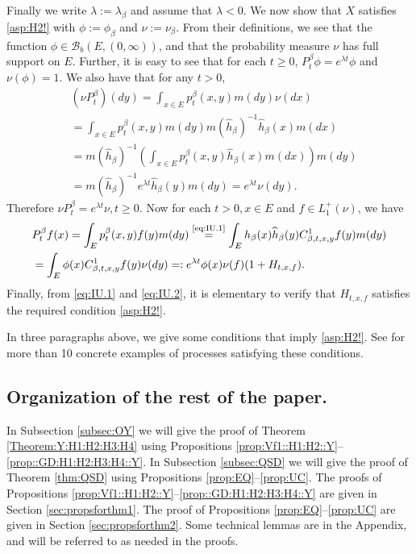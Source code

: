 \documentclass[12pt,a4paper]{amsart}
\numberwithin{equation}{section}
\theoremstyle{plain}
\theoremstyle{definition}
\theoremstyle{remark}
\begin{document}
Finally we write $\lambda := \lambda_\beta$ and assume that $ \lambda< 0$. We now show that $X$ satisfies \eqref{asp:H2!} with $\phi:=\phi_\beta$ and $\nu:= \nu_\beta$.
	From their definitions, we see that the function $\phi \in \mathcal B_b(E,(0,\infty))$, and that the probability measure $\nu$ has full support on $E$.
	Further, it is easy to see that for each $t\geq 0$, $P_t^\beta \phi = e^{\lambda t}\phi$ and $\nu(\phi) = 1$.
	We also have that for any $t>0$,
\begin{align}
	&(\nu P_t^\beta)(dy) = \int_{x\in E}p_{t}^\beta(x,y)m(dy) \nu(dx)
	\\&= \int_{x\in E}p_{t}^\beta(x,y)m(dy) m(\widehat h_\beta)^{-1}\widehat h_\beta(x)m(dx)
	\\&=  m(\widehat h_\beta)^{-1}  \left(\int_{x\in E} p_t^\beta(x,y) \widehat h_\beta(x) m(dx) \right) m(dy)
	\\& = m(\widehat h_\beta)^{-1} e^{\lambda t}\widehat h_\beta(y) m(dy) =
	e^{\lambda t}\nu(dy).
\end{align}
	Therefore $\nu P_t^\beta = e^{\lambda t}\nu, t\geq 0$. Now for each $t>0, x \in E$ and $f\in L_1^+(\nu)$, we have
\begin{align}
	&P_t^\beta f(x) = \int_{E} p^\beta_t(x,y) f(y)m(dy)
	\overset{\text{\eqref{eq:IU.1}}}= \int_{E} h_\beta (x) \widehat h_\beta (y) C^1_{\beta,t,x,y} f(y) m(dy)
	\\&= \int_{E} \phi (x)  C^1_{\beta,t,x,y} f(y) \nu(dy)
	=: e^{\lambda t} \phi(x) \nu(f) (1+ H_{t,x,f}).
\end{align}
	Finally, from \eqref{eq:IU.1} and \eqref{eq:IU.2}, it is elementary to verify that $H_{t,x,f}$ satisfies the required condition \eqref{asp:H2!}.

	In three paragraphs above, we give some conditions that imply \eqref{asp:H2!}. See \cite[Section 1.4]{RenSongZhang2015Limit} for more than 10 concrete examples of processes satisfying these conditions.

	\subsection*{Organization of the rest of the paper.}
	In Subsection \ref{subsec:OY} we will give the proof of Theorem \ref{Theorem:Y:H1:H2:H3:H4}
    using Propositions \ref{prop:Vf1::H1:H2::Y}--\ref{prop::GD:H1:H2:H3:H4::Y}.
	In Subsection \ref{subsec:QSD} we will give the proof of Theorem \ref{thm:QSD}
	using Propositions \ref{prop:EQ}--\ref{prop:UC}.
	The proofs of Propositions \ref{prop:Vf1::H1:H2::Y}--\ref{prop::GD:H1:H2:H3:H4::Y} are given in
	Section \ref{sec:propsforthm1}.
 The proof of  Propositions \ref{prop:EQ}--\ref{prop:UC} are given in Section \ref{sec:propsforthm2}.
	Some technical lemmas are in the Appendix, and will be referred to as needed in the proofs.
	
\end{document}
